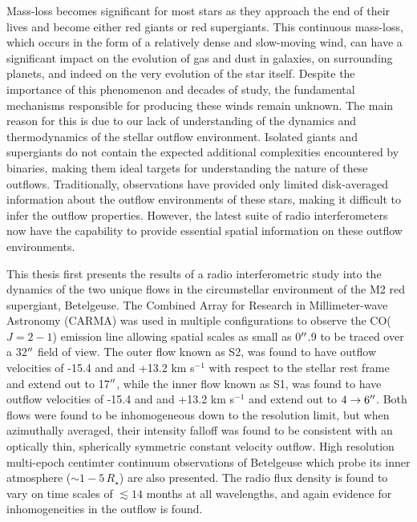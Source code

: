 
\begin{abstracts} 

Mass-loss becomes significant for most stars as they approach the end of their lives and become either red giants or red supergiants. This continuous mass-loss, which occurs in the form of a relatively dense and slow-moving wind, can have a significant impact on the evolution of gas and dust in galaxies, on surrounding planets, and indeed on the very evolution of the star itself.  Despite the importance of this phenomenon and decades of study,
the fundamental mechanisms responsible for producing these winds remain unknown. The main reason for this is due to our lack of understanding of the dynamics and thermodynamics of the stellar outflow environment. Isolated giants and supergiants do not contain the expected additional complexities encountered by binaries, making them ideal targets for understanding the nature of these outflows. Traditionally, observations have provided only limited disk-averaged information about the outflow environments of these stars, making it difficult to infer the outflow properties. However, the latest suite of radio interferometers now have the capability to provide essential spatial information on these outflow environments.

This thesis first presents the results of a radio interferometric study into the dynamics of the two unique flows in the circumstellar environment of the  M2 red supergiant, Betelgeuse. The  Combined Array for Research in Millimeter-wave Astronomy (CARMA) was used in multiple configurations to observe the CO($J=2-1$) emission line allowing  spatial scales as small as 0$^{\prime\prime}$.9 to be traced over a 32$^{\prime\prime}$  field of view. The outer flow known as S2, was found to have outflow velocities of -15.4 and and +13.2 km s$^{-1}$ with respect to the stellar rest frame and extend out to 17$^{\prime\prime}$, while the inner flow known as S1, was found to have outflow velocities of -15.4 and and +13.2 km s$^{-1}$ and extend out to $4 \rightarrow 6^{\prime\prime}$. Both flows were found to be inhomogeneous down to the resolution limit, but when azimuthally averaged, their intensity falloff was found to be consistent with an optically thin, spherically symmetric constant velocity outflow. High resolution multi-epoch centimter continuum observations of Betelgeuse which probe its inner atmosphere ($\sim 1-5\,R_{\star}$) are also presented. The radio flux density is found to vary on time scales of $\lesssim 14$ months at all wavelengths, and again evidence for inhomogeneities in the outflow is found.


\end{abstracts}
